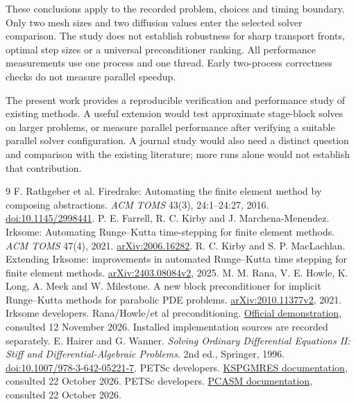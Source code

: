 \documentclass[11pt,a4paper]{article}
\begin{document}
These conclusions apply to the recorded problem, choices and timing boundary. Only two mesh sizes and two diffusion values enter the selected solver comparison. The study does not establish robustness for sharp transport fronts, optimal step sizes or a universal preconditioner ranking. All performance measurements use one process and one thread. Early two-process correctness checks do not measure parallel speedup.

The present work provides a reproducible verification and performance study of existing methods. A useful extension would test approximate stage-block solves on larger problems, or measure parallel performance after verifying a suitable parallel solver configuration. A journal study would also need a distinct question and comparison with the existing literature; more runs alone would not establish that contribution.

\begin{thebibliography}{9}\small
{} F. Rathgeber et al. Firedrake: Automating the finite element method by composing abstractions. \emph{ACM TOMS} 43(3), 24:1--24:27, 2016. \href{https://doi.org/10.1145/2998441}{doi:10.1145/2998441}.
 P. E. Farrell, R. C. Kirby and J. Marchena-Menendez. Irksome: Automating Runge--Kutta time-stepping for finite element methods. \emph{ACM TOMS} 47(4), 2021. \href{https://arxiv.org/abs/2006.16282}{arXiv:2006.16282}.
 R. C. Kirby and S. P. MacLachlan. Extending Irksome: improvements in automated Runge--Kutta time stepping for finite element methods. \href{https://arxiv.org/abs/2403.08084v2}{arXiv:2403.08084v2}, 2025.
 M. M. Rana, V. E. Howle, K. Long, A. Meek and W. Milestone. A new block preconditioner for implicit Runge--Kutta methods for parabolic PDE problems. \href{https://arxiv.org/abs/2010.11377v2}{arXiv:2010.11377v2}, 2021.
 Irksome developers. Rana/Howle/et al preconditioning. \href{https://www.firedrakeproject.org/Irksome/demos/demo_heat_rana.py.html}{Official demonstration}, consulted 12 November 2026. Installed implementation sources are recorded separately.
 E. Hairer and G. Wanner. \emph{Solving Ordinary Differential Equations II: Stiff and Differential-Algebraic Problems}. 2nd ed., Springer, 1996. \href{https://doi.org/10.1007/978-3-642-05221-7}{doi:10.1007/978-3-642-05221-7}.
 PETSc developers. \href{https://petsc.org/release/manualpages/KSP/KSPGMRES/}{KSPGMRES documentation}, consulted 22 October 2026.
 PETSc developers. \href{https://petsc.org/release/manualpages/PC/PCASM/}{PCASM documentation}, consulted 22 October 2026.
\end{thebibliography}
\end{document}
